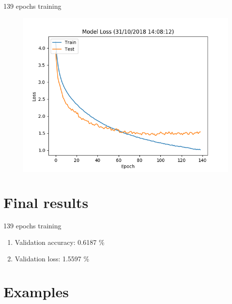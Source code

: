 \documentclass{beamer}
\begin{document}
\begin{frame}[fragile]{139 epochs training}
 \begin{figure}[H]
  \centering
  \includegraphics[scale=0.55]{img/loss_139.png}
 \end{figure}
\end{frame}



\section{Final results}

\begin{frame}[fragile]{139 epochs training}
 \begin{enumerate}
  \item Validation accuracy: 0.6187 \%
  \item Validation loss: 1.5597 \%
 \end{enumerate}
\end{frame}

\section{Examples}
\end{document}
